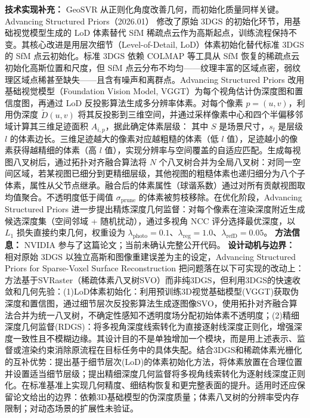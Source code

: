 \textbf{技术实现补充：} GeoSVR 从正则化角度改善几何，而初始化质量同样关键。Advancing Structured Priors（2026.01） 修改了原始 3DGS 的初始化环节，用基础视觉模型生成的 LoD 体素替代 SfM 稀疏点云作为高斯起点，训练流程保持不变。其核心改进是用层次细节（Level-of-Detail, LoD）体素初始化替代标准 3DGS 的 SfM 点云初始化。标准 3DGS 依赖 COLMAP 等工具从 SfM 恢复的稀疏点云初始化高斯位置和尺度，但 SfM 点云分布不均匀——纹理丰富的区域点密，弱纹理区域点稀甚至缺失——且含有噪声和离群点。Advancing Structured Priors 改用基础视觉模型（Foundation Vision Model, VGGT）为每个视角估计伪深度图和置信度图，再通过 LoD 反投影算法生成多分辨率体素。对每个像素 $p=(u,v)$，利用伪深度 $\tilde{D}(u,v)$ 将其反投影到三维空间，并通过采样像素中心和四个半偏移邻域计算其三维足迹面积 $A_{i,p}$，据此确定体素层级： 其中 $S$ 是场景尺寸，$s_l$ 是层级 $l$ 的体素边长。三维足迹越大的像素对应越粗糙的体素（低 $l$ 值），足迹越小的像素获得越精细的体素（高 $l$ 值），实现分辨率与空间覆盖的自适应匹配。生成每视图八叉树后，通过拓扑对齐融合算法将 $N$ 个八叉树合并为全局八叉树：对同一空间区域，若某视图已细分到更精细层级，其他视图的粗糙体素也递归细分为八个子体素，属性从父节点继承。融合后的体素属性（球谐系数）通过对所有贡献视图取均值聚合。不透明度低于阈值 $\sigma_{\mathrm{prune}}$ 的体素被剪枝移除。在优化阶段，Advancing Structured Priors 进一步提出精炼深度几何监督：对每个像素在渲染深度附近生成候选深度集（空间邻域 + 随机扰动），通过多视角 NCC 评分选择最优深度，以 $L_1$ 损失直接约束几何，权重设为 $\lambda_{\mathrm{photo}} = 0.1$、$\lambda_{\mathrm{reg}} = 1.0$、$\lambda_{\mathrm{refD}} = 0.05$。
\textbf{方法信息：} NVIDIA 参与了这篇论文；当前未确认完整公开代码。
\textbf{设计动机与边界：} 相对原始 3DGS 以独立高斯和图像重建误差为主的设定，Advancing Structured Priors for Sparse-Voxel Surface Reconstruction 把问题落在以下可实现的改动上：方法基于SVRaster（稀疏体素八叉树SVO）而非纯3DGS，但利用3DGS的快速收敛和几何先验：(1)LoD体素初始化：利用预训练3D视觉基础模型(VGGT)获取伪深度和置信图，通过细节层次反投影算法生成逐图像SVO，使用拓扑对齐融合算法合并为统一八叉树，不确定性感知不透明度场分配初始体素不透明度；(2)精细深度几何监督(RDGS)：将多视角深度线索转化为直接逐射线深度正则化，增强深度一致性且不模糊边缘。其设计目的不是单独增加一个模块，而是用上述表示、监督或渲染约束消除原流程在目标任务中的具体失配。结合3DGS和稀疏体素光栅化的互补优势：提出基于细节层次(LoD)的体素初始化方法，将体素放置在合理位置并设置适当细节层级；提出精细深度几何监督将多视角线索转化为逐射线深度正则化。在标准基准上实现几何精度、细结构恢复和更完整表面的提升。适用时还应保留论文给出的边界：依赖3D基础模型的伪深度质量；体素八叉树的分辨率受内存限制；对动态场景的扩展性未验证。

